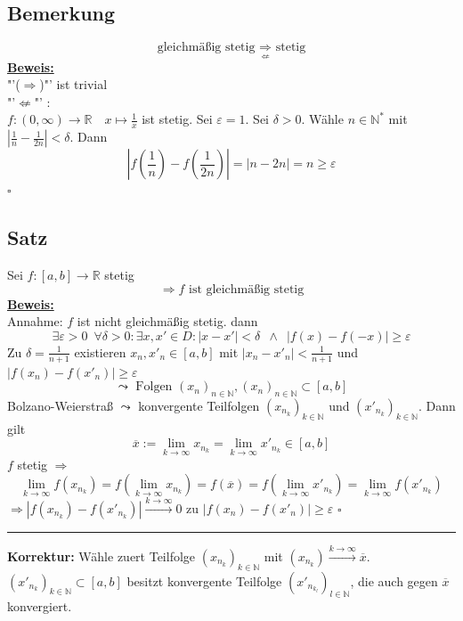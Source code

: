 \subsection{Bemerkung} %
\label{sub:bemerkung}
\[
	\text{gleichmäßig stetig } \underset{\not\Leftarrow}{\Longrightarrow} \text{ stetig}
\]
\underline{\textbf{Beweis:}} \\
"'($\Rightarrow $)"' ist trivial
\vspace{10pt} \\
"'$\not\Leftarrow$"' :\\
$f: (0, \infty) \to \mathds{R} \quad x \mapsto \frac{1}{x} $ ist stetig. Sei $\varepsilon = 1$. Sei $\delta >0$. Wähle
$n \in \mathds{N}^* $ mit $| \frac{1}{n} - \frac{1}{2n}| < \delta $. Dann
\[
	\left| f\left(\frac{1}{n}\right) - f\left( \frac{1}{2n}\right) \right| = |n-2n| = n \ge \varepsilon
\]
\hfill \( \square \)

\subsection{Satz} %
\label{sub:satz}
Sei $f: [a,b] \to \mathds{R}$ stetig
\[
	\Rightarrow f \text{ ist gleichmäßig stetig}
\]
\underline{\textbf{Beweis:}} \\
Annahme: $f$ ist nicht gleichmäßig stetig. dann
\[
	\exists \varepsilon > 0 \enspace \forall \delta >0 : \exists x,x' \in D : |x-x'| < \delta \enspace \wedge \enspace |f(x)- f(-x)| \ge \varepsilon
\]
Zu $\delta = \frac{1}{n+1}$ existieren $x_n , x'_n \in [a,b]$ mit $|x_n - x'_n|< \frac{1}{n+1} $ und $ \big| f(x_n)-f(x'_n)\big| \ge \varepsilon$
\[
	\leadsto \text{ Folgen } (x_n)_{n \in \mathds{N}} , (x_n)_{n \in \mathds{N}} \subset [a,b]
\]
Bolzano-Weierstraß $\leadsto$ konvergente Teilfolgen $\left( x_{n_k} \right) _{k \in \mathds{N}}$ und $ \left( x'_{n_k} \right) _{k \in \mathds{N}}$.
Dann gilt
\[
	\overline{x} := \lim\limits_{k \to \infty} x_{n_k} = \lim\limits_{k \to \infty} x'_{n_k} \in [a,b]
\] 
$f$ stetig $\Rightarrow $
\[
	\lim\limits_{k \to \infty} f \left(x_{n_k}\right) = f \left( \lim\limits_{k \to \infty} x_{n_k}\right) = f( \overline{x}) = 
	f \left( \lim\limits_{k \to \infty} x'_{n_k}\right)  = \lim\limits_{k \to \infty} f \left(x'_{n_k}\right)
\]
$\Rightarrow \left| f\left(x_{n_k}\right) - f \left(x'_{n_k}\right) \right| \xrightarrow{k \to \infty} 0$ \quad {\huge $\lightning$} 
zu $ \left| f(x_n) - f(x'_n)\right| \ge \varepsilon$ \hfill \( \square \) 
\vspace{10pt} \\
\hrule 
\vspace{10pt} 
\textbf{Korrektur:} Wähle zuert Teilfolge $ \left(x_{n_k}\right)_{k \in \mathds{N}}$ mit $ \left(x_{n_k}\right) \xrightarrow{k \to \infty} \overline{x}$.
$ \left(x'_{n_k}\right)_{k \in \mathds{N}} \subset [a,b]$ besitzt konvergente Teilfolge $ \left(x'_{n_{k_l}}\right)_{l \in \mathds{N}}$, die auch gegen 
$\overline{x}$ konvergiert.

